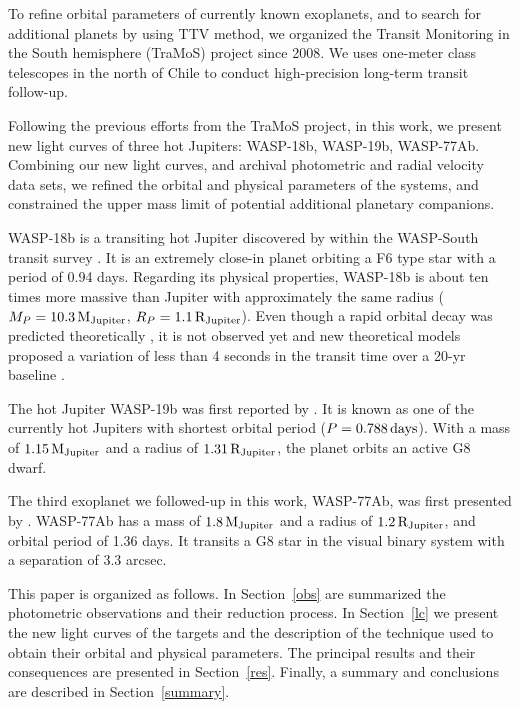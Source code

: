 To refine orbital parameters of currently known exoplanets, and to search for additional planets by using TTV method, we organized the Transit Monitoring in the South hemisphere (TraMoS) project \citep{Hoyer2011} since 2008. We uses one-meter class telescopes in the north of Chile to conduct high-precision long-term transit follow-up. 

Following the previous efforts from the TraMoS project, in this work, we present new light curves of three hot Jupiters: WASP-18b, WASP-19b, WASP-77Ab. Combining our new light curves, and archival photometric and radial velocity data sets, we refined the orbital and physical parameters of the systems, and constrained the upper mass limit of potential additional planetary companions. 

WASP-18b is a transiting hot Jupiter discovered by \citet{Hellier2009} within the WASP-South transit survey \citep{Pollacco2006}. It is an extremely close-in planet orbiting a F6 type star with a period of 0.94 days. Regarding its physical properties, WASP-18b is about ten times more massive than Jupiter with approximately the same radius ($M_{P}=10.3\,{\rm M_{Jupiter}}$, $R_{P}=1.1\,{\rm R_{Jupiter}}$). Even though a rapid orbital decay was predicted theoretically \citep{Hellier2009}, it is not observed yet \citep{Wilkins2017} and new theoretical models proposed a variation of less than 4 seconds in the transit time over a 20-yr baseline \citep{CollierCameron2018}.

The hot Jupiter WASP-19b was first reported by \cite{Hebb2010}. It is known as one of the currently hot Jupiters with shortest orbital period ($P=0.788\,{\rm days}$). With a mass of $1.15\,{\rm M_{Jupiter}}$ and a radius of $1.31\,{\rm R_{Jupiter}}$, the planet orbits an active G8 dwarf.

The third exoplanet we followed-up in this work, WASP-77Ab, was first presented by \cite{Maxted2013}. WASP-77Ab has a mass of $1.8\,{\rm M_{Jupiter}}$ and a radius of $1.2\,{\rm R_{Jupiter}}$, and orbital period of 1.36 days. It transits a G8 star in the visual binary system with a separation of 3.3 arcsec.

This paper is organized as follows. In Section~\ref{obs} are summarized the photometric observations and their reduction process. In Section~\ref{lc} we present the new light curves of the targets and the description of the technique used to obtain their orbital and physical parameters. The principal results and their consequences are presented in Section~\ref{res}. Finally, a summary and conclusions are described in Section~\ref{summary}.


